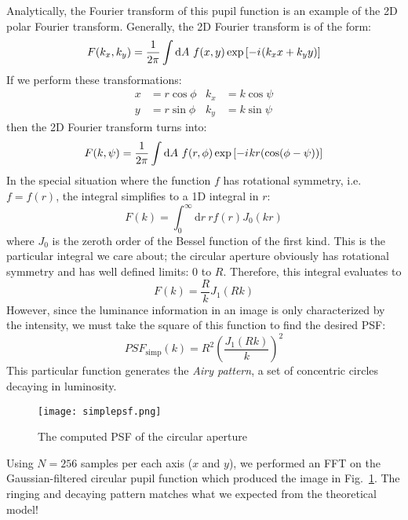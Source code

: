 \documentclass[%
 reprint,
 amsmath,amssymb,
 aps,
 pra,
]{revtex4-1}
\newcommand{\D}{\mathrm{d}}
\newcommand{\iu}{{i\mkern1mu}}
\begin{document}
{Analytically, the Fourier transform of this pupil function is an example of the 2D polar Fourier transform. Generally, the 2D Fourier transform is of the form:
\begin{equation}
  F(k_x, k_y) = \frac{1}{2\pi}\int\D A\ f(x, y)\exp\left[-\iu(k_x x + k_y y)\right] \label{eq:2dfourier}
\end{equation}
If we perform these transformations:
\begin{align*}
  x &= r\cos\phi & k_x &= k\cos\psi \\
  y &= r\sin\phi & k_y &= k\sin\psi
\end{align*}
then the 2D Fourier transform turns into:
\begin{equation}
  F(k, \psi) = \frac{1}{2\pi}\int\D A\ f(r, \phi)\exp\left[-\iu kr(\cos(\phi - \psi))\right] \label{eq:2dpolarfourier}
\end{equation}
In the special situation where the function $f$ has rotational symmetry, i.e. $f=f(r)$, the integral simplifies to a 1D integral in $r$:
\begin{equation}
  F(k) = \int_0^{\infty}\D r\ r f(r)J_0(kr) \label{eq:2dpolarfouriersym}
\end{equation}
where $J_0$ is the zeroth order of the Bessel function of the first kind. This is the particular integral we care about; the circular aperture obviously has rotational symmetry and has well defined limits: 0 to $R$. Therefore, this integral evaluates to
\begin{equation*}
  F(k) = \frac{R}{k}J_1(R k)
\end{equation*}
However, since the luminance information in an image is only characterized by the intensity, we must take the square of this function to find the desired PSF\@:
\begin{equation}
  PSF_{\text{simp}}(k) = R^2 \left(\frac{J_1(R k)}{k}\right)^2 \label{eq:psf-simp}
\end{equation}
This particular function generates the \textit{Airy pattern}, a set of concentric circles decaying in luminosity.

\begin{figure}[!ht]
  \centering
    \texttt{[image: simplepsf.png]}
  \caption{The computed PSF of the circular aperture}\label{fig:simplepsf}
\end{figure}

Using $N=256$ samples per each axis ($x$ and $y$), we performed an FFT on the Gaussian-filtered circular pupil function which produced the image in Fig.~\ref{fig:simplepsf}. The ringing and decaying pattern matches what we expected from the theoretical model!

}
\end{document}
